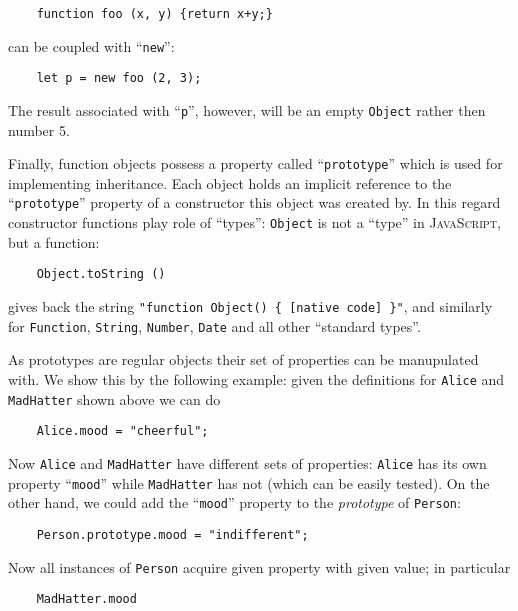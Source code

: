 \documentclass{article}
\newcommand{\js}{\textsc{JavaScript}\xspace}
\newcommand{\out}[1]{\texttt{#1}}
\begin{document}
\begin{lstlisting}
    function foo (x, y) {return x+y;}
\end{lstlisting}

can be coupled with ``\lstinline|new|'':

\begin{lstlisting}
    let p = new foo (2, 3);
\end{lstlisting}

The result associated with ``\lstinline|p|'', however, will be an empty \lstinline|Object| rather then number 5.

Finally, function objects possess a property called ``\lstinline|prototype|'' which is used for implementing
inheritance. Each object holds an implicit reference to the ``\lstinline|prototype|''
property of a constructor this object was created by. In this regard constructor functions play role of ``types'':
\lstinline|Object| is not a ``type'' in \js, but a function:

\begin{lstlisting}
    Object.toString ()
\end{lstlisting}

gives back the string \out{"function Object() \{ [native code] \}"}, and similarly for \lstinline|Function|,
\lstinline|String|, \lstinline|Number|, \lstinline|Date| and  all other ``standard types''.

As prototypes are regular objects their set of properties can be manupulated with. We show this by the following
example: given the definitions for \lstinline|Alice| and \lstinline|MadHatter| shown above we can do

\begin{lstlisting}
    Alice.mood = "cheerful";
\end{lstlisting}

Now \lstinline|Alice| and \lstinline|MadHatter| have different sets of properties: \lstinline|Alice| has its
own property ``\lstinline|mood|'' while \lstinline|MadHatter| has not (which can be easily
tested). On the other hand, we could add the ``\lstinline|mood|'' property to the \emph{prototype} of
\lstinline|Person|:

\begin{lstlisting}
    Person.prototype.mood = "indifferent";
\end{lstlisting}

Now all instances of \lstinline|Person| acquire given property with given value; in particular

\begin{lstlisting}
    MadHatter.mood
\end{lstlisting}
\end{document}
